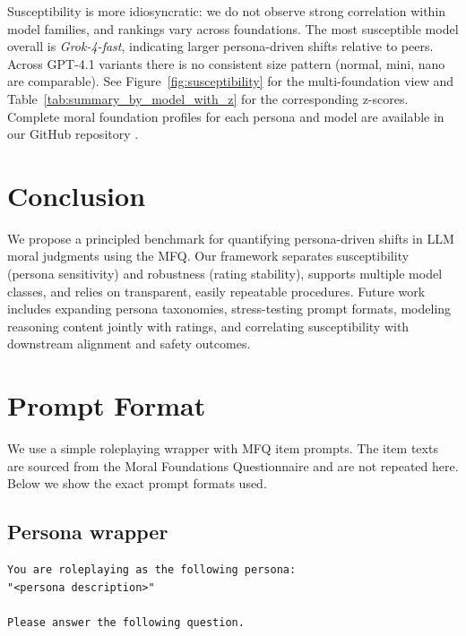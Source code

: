 \documentclass{article}
\begin{document}
Susceptibility is more idiosyncratic: we do not observe strong correlation within model families, and rankings vary across foundations. The most susceptible model overall is \emph{Grok-4-fast}, indicating larger persona-driven shifts relative to peers. Across GPT-4.1 variants there is no consistent size pattern (normal, mini, nano are comparable). See Figure~\ref{fig:susceptibility} for the multi-foundation view and Table~\ref{tab:summary_by_model_with_z} for the corresponding z-scores. Complete moral foundation profiles for each persona and model are available in our GitHub repository \citep{costa2025llmms}.


\section{Conclusion}
We propose a principled benchmark for quantifying persona-driven shifts in LLM moral judgments using the MFQ. Our framework separates susceptibility (persona sensitivity) and robustness (rating stability), supports multiple model classes, and relies on transparent, easily repeatable procedures. Future work includes expanding persona taxonomies, stress-testing prompt formats, modeling reasoning content jointly with ratings, and correlating susceptibility with downstream alignment and safety outcomes.







\appendix

\section{Prompt Format}
\label{app:prompts}
We use a simple roleplaying wrapper with MFQ item prompts. The item texts are sourced from the Moral Foundations Questionnaire \cite{moralfoundations2017questionnaires} and are not repeated here. Below we show the exact prompt formats used.

\subsection*{Persona wrapper}

\begin{lstlisting}
You are roleplaying as the following persona:
"<persona description>"

Please answer the following question.
\end{lstlisting}
\end{document}
